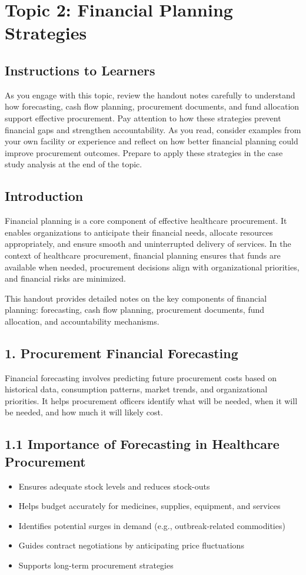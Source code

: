 \documentclass[10pt]{article}
\begin{document}
\section*{Topic 2: Financial Planning Strategies}
\subsection*{Instructions to Learners}
As you engage with this topic, review the handout notes carefully to understand how forecasting, cash flow planning, procurement documents, and fund allocation support effective procurement. Pay attention to how these strategies prevent financial gaps and strengthen accountability. As you read, consider examples from your own facility or experience and reflect on how better financial planning could improve procurement outcomes. Prepare to apply these strategies in the case study analysis at the end of the topic.

\subsection*{Introduction}
Financial planning is a core component of effective healthcare procurement. It enables organizations to anticipate their financial needs, allocate resources appropriately, and ensure smooth and uninterrupted delivery of services. In the context of healthcare procurement, financial planning ensures that funds are available when needed, procurement decisions align with organizational priorities, and financial risks are minimized.

This handout provides detailed notes on the key components of financial planning: forecasting, cash flow planning, procurement documents, fund allocation, and accountability mechanisms.

\subsection*{1. Procurement Financial Forecasting}
Financial forecasting involves predicting future procurement costs based on historical data, consumption patterns, market trends, and organizational priorities. It helps procurement officers identify what will be needed, when it will be needed, and how much it will likely cost.

\subsection*{1.1 Importance of Forecasting in Healthcare Procurement}
\begin{itemize}
  \item Ensures adequate stock levels and reduces stock-outs
  \item Helps budget accurately for medicines, supplies, equipment, and services
  \item Identifies potential surges in demand (e.g., outbreak-related commodities)
  \item Guides contract negotiations by anticipating price fluctuations
  \item Supports long-term procurement strategies
\end{itemize}
\end{document}
